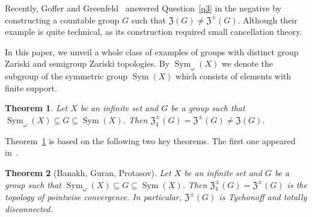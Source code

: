 \documentclass[11pt]{amsart}
\newtheorem{theorem}{Theorem}[section]
\theoremstyle{definition}
\newcommand{\Sym}{\operatorname{Sym}}
\begin{document}
Recently, Goffer and Greenfeld~\cite{GG} answered Question~\ref{q3} in the negative by constructing a countable group $G$ such that $\mathfrak{Z}(G)\neq \mathfrak{Z}^{\pm}(G)$. Although their example is quite technical, as its construction required small cancellation theory.











 
In this paper, we unveil a whole class of examples of groups with distinct group Zariski and semigroup Zariski topologies. By $\Sym_\omega(X)$ we denote the subgroup of the symmetric group $\Sym(X)$ which consists of elements with finite support.




\begin{theorem}\label{thmain1}
Let $X$ be an infinite set and $G$ be a group such that $\Sym_\omega(X)\subseteq G\subseteq \Sym(X)$. Then $\mathfrak{Z}^{\pm}_{4}(G)=\mathfrak{Z}^{\pm}(G)\neq \mathfrak{Z}(G)$. 
\end{theorem}

Theorem~\ref{thmain1} is based on the following two key theorems. The first one appeared in~\cite{Banakh}.

\begin{theorem}[Banakh, Guran, Protasov]\label{citeB}
Let $X$ be an infinite set and $G$ be a group such that $\Sym_\omega(X)\subseteq G\subseteq \Sym(X)$. Then $\mathfrak{Z}^{\pm}_{4}(G)=\mathfrak{Z}^{\pm}(G)$ is the topology of pointwise convergence. In particular, $\mathfrak{Z}^{\pm}(G)$ is Tychonoff and totally disconnected.
\end{theorem}
\end{document}
